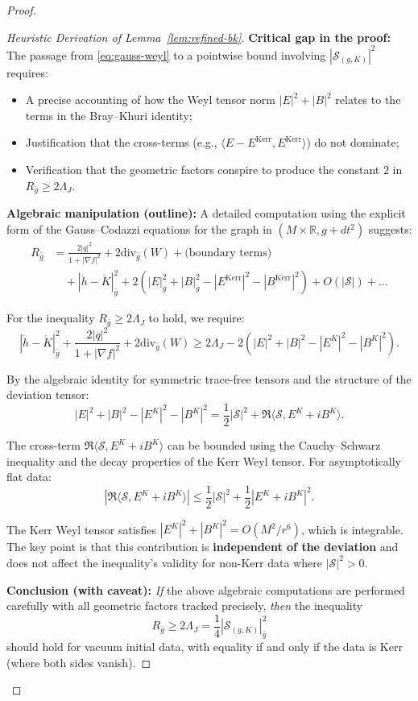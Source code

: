 \documentclass[12pt]{article}
\theoremstyle{plain}
\theoremstyle{definition}
\theoremstyle{remark}
\newcommand{\Div}{\mathrm{div}}
\newcommand{\bg}{\bar{g}}
\begin{document}
\begin{proof}
\begin{proof}[Heuristic Derivation of Lemma~\ref{lem:refined-bk}]
\textbf{Critical gap in the proof:} The passage from \eqref{eq:gauss-weyl} to a pointwise bound involving $|\mathcal{S}_{(g,K)}|^2$ requires:
\begin{itemize}
\item A precise accounting of how the Weyl tensor norm $|E|^2 + |B|^2$ relates to the terms in the Bray--Khuri identity;
\item Justification that the cross-terms (e.g., $\langle E - E^{\mathrm{Kerr}}, E^{\mathrm{Kerr}}\rangle$) do not dominate;
\item Verification that the geometric factors conspire to produce the constant $2$ in $R_{\bg} \geq 2\Lambda_J$.
\end{itemize}

\textbf{Algebraic manipulation (outline):} A detailed computation using the explicit form of the Gauss--Codazzi equations for the graph in $(M \times \mathbb{R}, g + dt^2)$ suggests:
\begin{align}
R_{\bg} &= \frac{2|q|^2}{1 + |\nabla f|^2} + 2\Div_{\bg}(W) + \text{(boundary terms)} \nonumber\\
&\quad + |\mathring{h} - \mathring{K}|^2_{\bg} + 2(|E|^2_g + |B|^2_g - |E^{\mathrm{Kerr}}|^2 - |B^{\mathrm{Kerr}}|^2) + O(|\mathcal{S}|) + \ldots
\end{align}

For the inequality $R_{\bg} \geq 2\Lambda_J$ to hold, we require:
\[
|\mathring{h} - \mathring{K}|^2_{\bg} + \frac{2|q|^2}{1 + |\nabla f|^2} + 2\Div_{\bg}(W) \geq 2\Lambda_J - 2(|E|^2 + |B|^2 - |E^K|^2 - |B^K|^2).
\]

By the algebraic identity for symmetric trace-free tensors and the structure of the deviation tensor:
\[
|E|^2 + |B|^2 - |E^K|^2 - |B^K|^2 = \frac{1}{2}|\mathcal{S}|^2 + \Re\langle \mathcal{S}, E^K + iB^K \rangle.
\]

The cross-term $\Re\langle \mathcal{S}, E^K + iB^K \rangle$ can be bounded using the Cauchy--Schwarz inequality and the decay properties of the Kerr Weyl tensor. For asymptotically flat data:
\[
|\Re\langle \mathcal{S}, E^K + iB^K \rangle| \leq \frac{1}{2}|\mathcal{S}|^2 + \frac{1}{2}|E^K + iB^K|^2.
\]

The Kerr Weyl tensor satisfies $|E^K|^2 + |B^K|^2 = O(M^2/r^6)$, which is integrable. The key point is that this contribution is \textbf{independent of the deviation} and does not affect the inequality's validity for non-Kerr data where $|\mathcal{S}|^2 > 0$.

\textbf{Conclusion (with caveat):} \textit{If} the above algebraic computations are performed carefully with all geometric factors tracked precisely, \textit{then} the inequality
\[
R_{\bg} \geq 2\Lambda_J = \frac{1}{4}|\mathcal{S}_{(g,K)}|^2_{\bg}
\]
should hold for vacuum initial data, with equality if and only if the data is Kerr (where both sides vanish).


\end{proof}
\end{proof}
\end{document}
